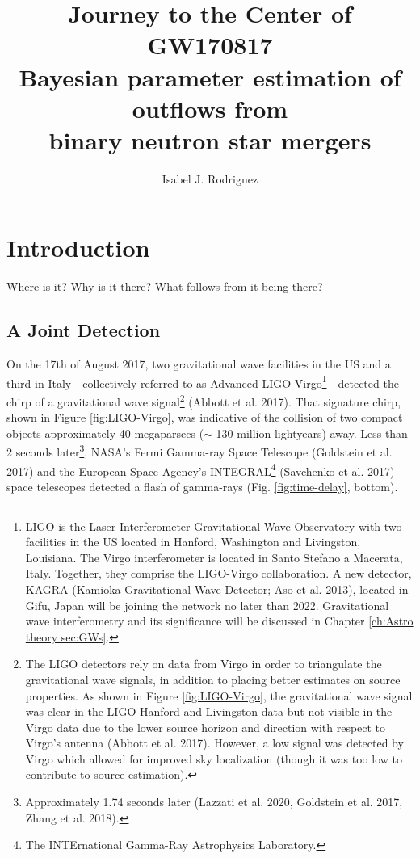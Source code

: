 \documentclass[1.5,11pt]{beavtex}
\title{\textbf{\fontfamily{lmss}\selectfont Journey to the Center of GW170817} \\ Bayesian parameter estimation of outflows from \\ binary neutron star mergers}
\author{Isabel J. Rodriguez}
\begin{document}
\maketitle
\mainmatter


\chapter{\selectfont Introduction} \label{ch:Intro}
 \begin{fquote}Where is it? Why is it there? What follows from it being there?
\end{fquote}


\section{A Joint Detection} \label{ch:Intro sec:joint detection}

On the 17th of August 2017, two gravitational wave facilities in the US and a third in Italy---collectively referred to as Advanced LIGO-Virgo\footnote{\selectfont LIGO is the  Laser Interferometer Gravitational Wave Observatory with two facilities in the US located in Hanford, Washington and Livingston, Louisiana. The Virgo interferometer is located in Santo Stefano a Macerata, Italy. Together, they comprise the LIGO-Virgo collaboration. A new detector, KAGRA (Kamioka Gravitational Wave Detector; Aso et al. 2013), located in  Gifu, Japan will be joining the network no later than 2022. Gravitational wave interferometry and its significance will be discussed in Chapter \ref{ch:Astro theory sec:GWs}.}---detected the chirp of a gravitational wave signal\footnote{\selectfont The LIGO detectors rely on data from Virgo in order to triangulate the gravitational wave signals, in addition to placing better estimates on source properties. As shown in Figure \ref{fig:LIGO-Virgo}, the gravitational wave signal was clear in the LIGO Hanford and Livingston data but not visible in the Virgo data due to the lower source horizon and direction with respect to Virgo's antenna (Abbott et al. 2017). However, a low signal was detected by Virgo which allowed for improved sky localization (though it was too low to contribute to source estimation).} (Abbott et al. 2017). That signature chirp, shown in Figure \ref{fig:LIGO-Virgo}, was indicative of the collision of two compact objects approximately 40 megaparsecs ($\sim$ 130 million lightyears) away.  Less than 2 seconds later\footnote{\selectfont Approximately 1.74 seconds later (Lazzati et al. 2020, Goldstein et al. 2017, Zhang et al. 2018).}, NASA's Fermi Gamma-ray Space Telescope (Goldstein et al. 2017) and the European Space Agency's INTEGRAL\footnote{The INTErnational Gamma-Ray Astrophysics Laboratory.} (Savchenko et al. 2017) space telescopes detected a flash of gamma-rays (Fig. \ref{fig:time-delay}, bottom).
\end{document}
